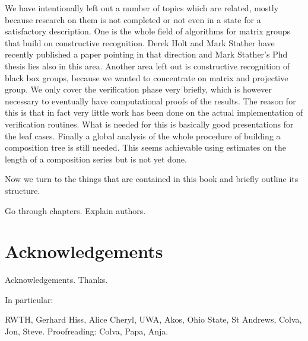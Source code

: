 We have intentionally left out a number of topics which are related, mostly
because research on them is not completed or not even in a state for a
satisfactory description. One is
the whole field of algorithms for matrix groups that build on constructive
recognition. Derek Holt and Mark Stather have recently published a paper
\cite{HoltStather} pointing in that direction and Mark Stather's Phd thesis
\cite{StatherPhd} lies also in this area. Another area left out is
constructive recognition of black box groups, because we wanted to
concentrate on matrix and projective group. We only cover the
verification phase very briefly, which is however necessary to eventually
have computational proofs of the results. The reason for this is that in
fact very little work has been done on the actual implementation of
verification routines. What is needed for this is basically good
presentations for the leaf cases. Finally a global analysis of the
whole procedure of building a composition tree is still needed. This seems
achievable using estimates on the length of a composition series but is not
yet done.

Now we turn to the things that are contained in this book and briefly
outline its structure. 

Go through chapters. Explain authors.

\section{Acknowledgements}

Acknowledgements. Thanks.

In particular:

RWTH, Gerhard Hiss, Alice Cheryl, UWA, Akos, Ohio State, St Andrews, Colva, Jon,
Steve. Proofreading: Colva, Papa, Anja.

\renewcommand{\thechapter}{\Roman{chapter}}

